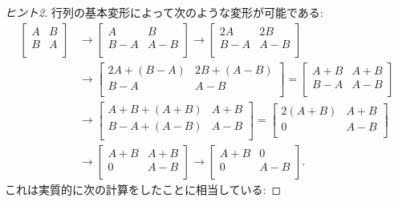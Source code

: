 \documentclass[12pt,twoside]{jarticle}
\begin{document}
\begin{proof}[ヒント2]
  行列の基本変形によって次のような変形が可能である:
  {\small
  \begin{align*}
    \begin{bmatrix}
      A & B \\
      B & A \\
    \end{bmatrix}
    & \to 
    \begin{bmatrix}
      A   & B   \\
      B-A & A-B \\
    \end{bmatrix}
    \to
    \begin{bmatrix}
      2A  & 2B  \\
      B-A & A-B \\
    \end{bmatrix}
    \\
    & \to
    \begin{bmatrix}
      2A+(B-A) & 2B+(A-B) \\
      B-A      & A-B \\
    \end{bmatrix}
    =
    \begin{bmatrix}
      A+B & A+B \\
      B-A & A-B \\
    \end{bmatrix}
    \\
    & \to
    \begin{bmatrix}
      A+B+(A+B) & A+B \\
      B-A+(A-B) & A-B \\
    \end{bmatrix}
    =
    \begin{bmatrix}
      2(A+B) & A+B \\
        0    & A-B \\
    \end{bmatrix}
    \\
    & \to
    \begin{bmatrix}
      A+B & A+B \\
       0  & A-B \\
    \end{bmatrix}
    \to
    \begin{bmatrix}
      A+B &  0  \\
       0  & A-B \\
    \end{bmatrix}.
  \end{align*}
  }これは実質的に次の計算をしたことに相当している:

\end{proof}
\end{document}
